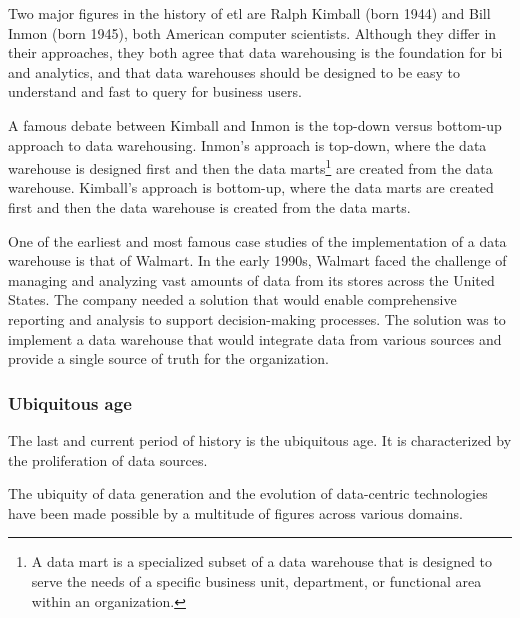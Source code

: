 Two major figures in the history of \gls{etl} are Ralph Kimball (born 1944) and Bill Inmon (born
1945), both American computer scientists.  Although they
differ in their approaches, they both agree that data warehousing is the foundation for
\gls{bi} and analytics, and that data warehouses should be designed to
be easy to understand and fast to query for business users.

A famous debate between Kimball and Inmon is the top-down versus bottom-up approach to
data warehousing.  Inmon's approach is top-down, where the data warehouse is designed
first and then the data marts\footnote{A data mart is a specialized subset of a data
warehouse that is designed to serve the needs of a specific business unit, department, or
functional area within an organization.} are created from the data warehouse.  Kimball's
approach is bottom-up, where the data marts are created first and then the data warehouse
is created from the data marts.

One of the earliest and most famous case studies of the implementation of a data warehouse
is that of Walmart. In the early 1990s, Walmart faced the challenge of managing and
analyzing vast amounts of data from its stores across the United States. The company
needed a solution that would enable comprehensive reporting and analysis to support
decision-making processes.  The solution was to implement a data warehouse that would
integrate data from various sources and provide a single source of truth for the
organization.

\subsubsection{Ubiquitous age}

The last and current period of history is the ubiquitous age.  It is characterized by the
proliferation of data sources.

The ubiquity of data generation and the evolution of data-centric technologies have been
made possible by a multitude of figures across various domains.

